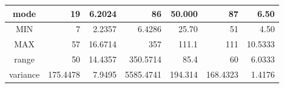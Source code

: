 \begin{table}[H]
\begin{adjustbox}{width = \textwidth, center}
\begin{tabular}{|c|rrrrrr|}
            \cellcolor[HTML]{B6D7A8}mode                                                 & \multicolumn{1}{r|}{19}                                         & \multicolumn{1}{r|}{6.2024}                                                  & \multicolumn{1}{r|}{86}                                                          & \multicolumn{1}{r|}{50.000}                              & \multicolumn{1}{r|}{87}                                 & 6.50                                                             \\ \hline
            \cellcolor[HTML]{CFE2F3}MIN                                                  & \multicolumn{1}{r|}{7}                                          & \multicolumn{1}{r|}{2.2357}                                                  & \multicolumn{1}{r|}{6.4286}                                                      & \multicolumn{1}{r|}{25.70}                               & \multicolumn{1}{r|}{51}                                 & 4.50                                                             \\ \hline
            \cellcolor[HTML]{CFE2F3}MAX                                                  & \multicolumn{1}{r|}{57}                                         & \multicolumn{1}{r|}{16.6714}                                                 & \multicolumn{1}{r|}{357}                                                         & \multicolumn{1}{r|}{111.1}                               & \multicolumn{1}{r|}{111}                                & 10.5333                                                          \\ \hline
            \cellcolor[HTML]{CFE2F3}range                                                & \multicolumn{1}{r|}{50}                                         & \multicolumn{1}{r|}{14.4357}                                                 & \multicolumn{1}{r|}{350.5714}                                                    & \multicolumn{1}{r|}{85.4}                                & \multicolumn{1}{r|}{60}                                 & 6.0333                                                           \\ \hline
            \cellcolor[HTML]{CFE2F3}variance                                             & \multicolumn{1}{r|}{175.4478}                                   & \multicolumn{1}{r|}{7.9495}                                                  & \multicolumn{1}{r|}{5585.4741}                                                   & \multicolumn{1}{r|}{194.314}                             & \multicolumn{1}{r|}{168.4323}                           & 1.4176                                                           \\ \hline

\end{tabular}
\end{adjustbox}
\end{table}
